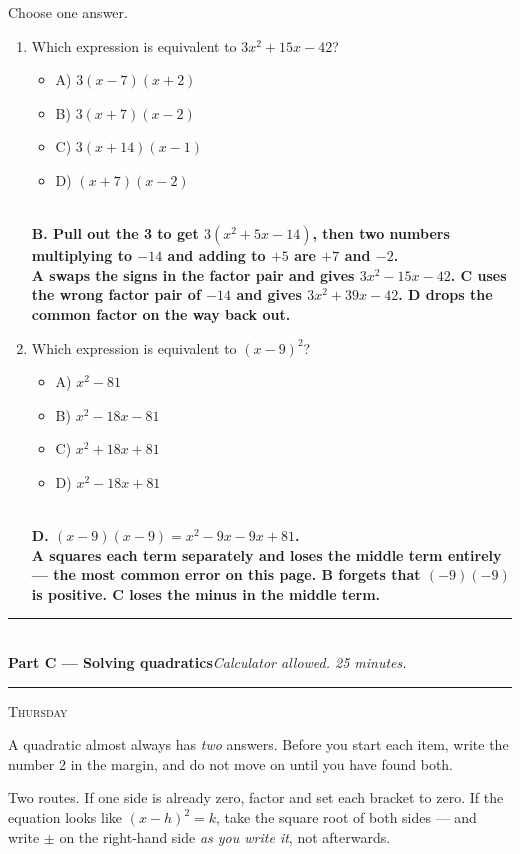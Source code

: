 \documentclass[11pt,a4paper]{article}
\newcommand{\PartHead}[2]{%
  \vspace{6pt}
  {\color{navy}\rule{\textwidth}{0.8pt}}\\[2pt]
  {\large\bfseries\color{navy}#1}\hfill{\small\itshape #2}\\[-4pt]
  {\color{navy}\rule{\textwidth}{0.4pt}}
  \vspace{4pt}
}
\newcommand{\sitting}[1]{{\footnotesize\textsc{\color{navy}#1}}\par\vspace{2pt}}
\newcommand{\ans}[1]{\ {\color{keyred}\bfseries #1}}
\newcommand{\ans}[1]{}
\newenvironment{choices}
  {\par\nopagebreak\begin{itemize}[label={},leftmargin=16pt,itemsep=0pt,topsep=2pt,parsep=0pt,%
     beginpenalty=10000,midpenalty=10000]}
  {\end{itemize}}
\begin{document}
\vspace{2pt}
Choose one answer.
\begin{enumerate}[leftmargin=20pt,itemsep=9pt,start=11]
\item Which expression is equivalent to $3x^2+15x-42$?
  \begin{choices}
  \item A) $3(x-7)(x+2)$
  \item B) $3(x+7)(x-2)$
  \item C) $3(x+14)(x-1)$
  \item D) $(x+7)(x-2)$
  \end{choices}
  \ans{\\ B. Pull out the 3 to get $3(x^2+5x-14)$, then two numbers multiplying to $-14$ and adding to $+5$ are $+7$ and $-2$. \\ A swaps the signs in the factor pair and gives $3x^2-15x-42$. C uses the wrong factor pair of $-14$ and gives $3x^2+39x-42$. D drops the common factor on the way back out.}

\item Which expression is equivalent to $(x-9)^2$?
  \begin{choices}
  \item A) $x^2-81$
  \item B) $x^2-18x-81$
  \item C) $x^2+18x+81$
  \item D) $x^2-18x+81$
  \end{choices}
  \ans{\\ D. $(x-9)(x-9)=x^2-9x-9x+81$. \\ A squares each term separately and loses the middle term entirely --- the most common error on this page. B forgets that $(-9)(-9)$ is positive. C loses the minus in the middle term.}
\end{enumerate}

\PartHead{Part C --- Solving quadratics}{Calculator allowed. 25 minutes.}
\sitting{Thursday}
A quadratic almost always has \emph{two} answers. Before you start each item, write
the number 2 in the margin, and do not move on until you have found both.

Two routes. If one side is already zero, factor and set each bracket to zero. If the
equation looks like $(x-h)^2=k$, take the square root of both sides --- and write
$\pm$ on the right-hand side \emph{as you write it}, not afterwards.
\end{document}
